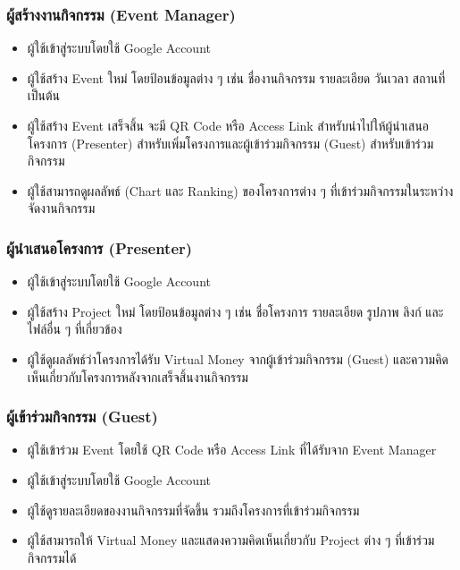 \subsubsection{ผู้สร้างงานกิจกรรม (Event Manager)}
\begin{itemize}
    \item ผู้ใช้เข้าสู่ระบบโดยใช้ Google Account
    \item ผู้ใช้สร้าง Event ใหม่ โดยป้อนข้อมูลต่าง ๆ เช่น ชื่องานกิจกรรม รายละเอียด วันเวลา สถานที่ เป็นต้น
    \item ผู้ใช้สร้าง Event เสร็จสิ้น จะมี QR Code หรือ Access Link สำหรับนำไปให้ผู้นำเสนอโครงการ (Presenter) สำหรับเพิ่มโครงการและผู้เข้าร่วมกิจกรรม (Guest) สำหรับเข้าร่วมกิจกรรม
    \item ผู้ใช้สามารถดูผลลัพธ์ (Chart และ Ranking) ของโครงการต่าง ๆ ที่เข้าร่วมกิจกรรมในระหว่างจัดงานกิจกรรม

\end{itemize}

\subsubsection{ผู้นำเสนอโครงการ (Presenter)}
\begin{itemize}
    \item ผู้ใช้เข้าสู่ระบบโดยใช้ Google Account
    \item ผู้ใช้สร้าง Project ใหม่ โดยป้อนข้อมูลต่าง ๆ เช่น ชื่อโครงการ รายละเอียด รูปภาพ ลิงก์ และไฟล์อื่น ๆ ที่เกี่ยวข้อง
    \item ผู้ใช้ดูผลลัพธ์ว่าโครงการได้รับ Virtual Money จากผู้เข้าร่วมกิจกรรม (Guest) และความคิดเห็นเกี่ยวกับโครงการหลังจากเสร็จสิ้นงานกิจกรรม

\end{itemize}

\subsubsection{ผู้เข้าร่วมกิจกรรม (Guest)}
\begin{itemize}
    \item ผู้ใช้เข้าร่วม Event โดยใช้ QR Code หรือ Access Link ที่ได้รับจาก Event Manager
    \item ผู้ใช้เข้าสู่ระบบโดยใช้ Google Account
    \item ผู้ใช้ดูรายละเอียดของงานกิจกรรมที่จัดขึ้น รวมถึงโครงการที่เข้าร่วมกิจกรรม
    \item ผู้ใช้สามารถให้ Virtual Money และแสดงความคิดเห็นเกี่ยวกับ Project ต่าง ๆ ที่เข้าร่วมกิจกรรมได้
\end{itemize}

